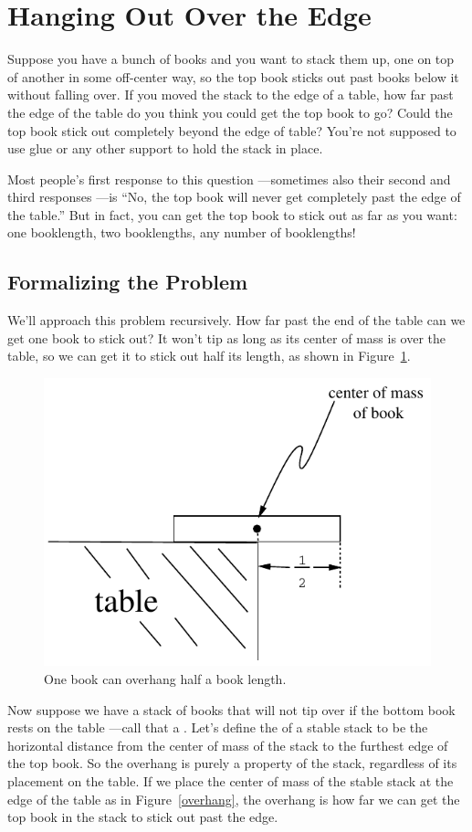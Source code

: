 \section{Hanging Out Over the Edge}\label{book_stacking_sec}

Suppose you have a bunch of books and you want to stack them up, one
on top of another in some off-center way, so the top book sticks out
past books below it without falling over.  If you moved the stack to
the edge of a table, how far past the edge of the table do you think
you could get the top book to go?  Could the top book stick out
completely beyond the edge of table?  You're not supposed to use glue
or any other support to hold the stack in place.

Most people's first response to this question ---sometimes also their
second and third responses ---is ``No, the top book will never get
completely past the edge of the table.''  But in fact, you can get the
top book to stick out as far as you want: one booklength, two
booklengths, any number of booklengths!

\subsection{Formalizing the Problem}

We'll approach this problem recursively.  How far past the end of the
table can we get one book to stick out?  It won't tip as long as its
center of mass is over the table, so we can get it to stick out half its
length, as shown in Figure~\ref{one-stable-book}.

\begin{figure}[htbp]
\centerline{\includegraphics[width=.60\textwidth]{figures/drafts/bookstack-3}}
\caption{One book can overhang half a book length.}
\label{one-stable-book}
\end{figure}

Now suppose we have a stack of books that will not tip over if the
bottom book rests on the table ---call that a .
Let's define the  of a stable stack to be the
horizontal distance from the center of mass of the stack to the
furthest edge of the top book.  So the overhang is purely a property
of the stack, regardless of its placement on the table.  If we place
the center of mass of the stable stack at the edge of the table as in
Figure~\ref{overhang}, the overhang is how far we can get the top book
in the stack to stick out past the edge.


